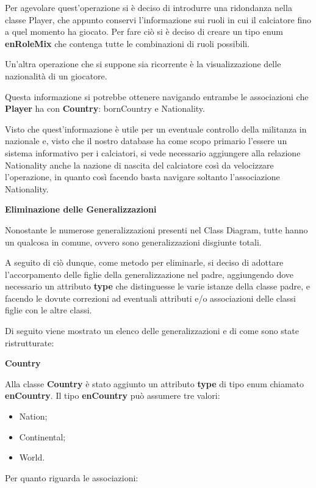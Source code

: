 Per agevolare quest'operazione si è deciso di introdurre
una ridondanza nella classe Player, che appunto conservi
l'informazione sui ruoli in cui il calciatore fino a
quel momento ha giocato.
Per fare ciò si è deciso di creare un tipo enum
\textbf{enRoleMix} che contenga tutte le combinazioni
di ruoli possibili.



Un'altra operazione che si suppone sia ricorrente è
la visualizzazione delle 
nazionalità di un giocatore.

Questa informazione si potrebbe ottenere navigando 
entrambe le associazioni che \textbf{Player} ha con 
\textbf{Country}: bornCountry e Nationality.

Visto che quest'informazione è utile per un eventuale
controllo della militanza in nazionale e,
visto che il nostro database ha come scopo primario l'essere 
un sistema informativo per i calciatori, si vede necessario 
aggiungere alla relazione Nationality anche la nazione di 
nascita del calciatore così da velocizzare l'operazione, in 
quanto così facendo basta navigare soltanto l'associazione 
Nationality.


\newpage
\textbf{\large Eliminazione delle Generalizzazioni}

Nonostante le numerose generalizzazioni presenti nel Class 
Diagram, tutte hanno un qualcosa in comune, ovvero sono 
generalizzazioni disgiunte totali.

A seguito di ciò dunque, come metodo per eliminarle, si 
deciso di adottare l'accorpamento delle figlie della 
generalizzazione nel padre, aggiungendo dove necessario un 
attributo \textbf{type} che distinguesse le varie istanze 
della classe padre, e facendo le dovute correzioni ad 
eventuali attributi e/o associazioni delle classi figlie
con le altre classi.

Di seguito viene mostrato un elenco delle generalizzazioni e 
di come sono state ristrutturate:

\bigskip
\textbf{Country}
\bigskip

Alla classe \textbf{Country} è stato aggiunto un attributo 
\textbf{type} di tipo enum chiamato \textbf{enCountry}.
Il tipo \textbf{enCountry} può assumere tre valori:
\begin{itemize}
	\item Nation;
	\item Continental;
	\item World.
\end{itemize}

Per quanto riguarda le associazioni:

